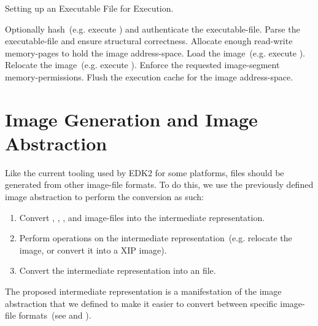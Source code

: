 \begin{algorithm}
  \caption{Setting up an Executable File for Execution.}
  \begin{algorithmic}[1]
    \State Optionally hash~(e.g. execute ) and authenticate the \gls{executable-file}.
    \State Parse the \gls{executable-file} and ensure structural correctness.
    \State Allocate enough read-write \glspl{memory-page} to hold the \gls{image} \gls{address-space}.
    \State Load the \gls{image}~(e.g. execute ).
    \State Relocate the \gls{image}~(e.g. execute ).
      \State Enforce the requested \gls{image-segment} \gls{memory-permissions}.
    \EndFor
    \State Flush the execution cache for the \gls{image} \gls{address-space}.
  \end{algorithmic}
\end{algorithm}

\FloatBarrier
\section{Image Generation and Image Abstraction}
\label{sec:inter_rep}

Like the current tooling used by \gls{EDK2} for some platforms,  files should be generated from other \gls{image-file} formats. To do this, we use the previously defined \gls{image} abstraction to perform the conversion as such:
\begin{enumerate}
  \item Convert , , , and  \glspl{image-file} into the intermediate representation.
  \item Perform operations on the intermediate representation~(e.g. relocate the \gls{image}, or convert it into a \gls{XIP} \gls{image}).
  \item Convert the intermediate representation into an  file.
\end{enumerate}

The proposed intermediate representation is a manifestation of the \gls{image} abstraction that we defined to make it easier to convert between specific \gls{image-file} formats~(see  and ).

